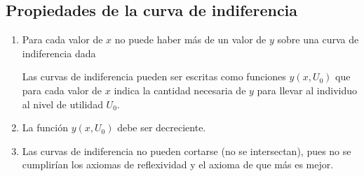 \documentclass{report}
\newcounter{axiom}
\begin{document}
\subsection{Propiedades de la curva de indiferencia}

\begin{enumerate}
    \item Para cada valor de $x$ no puede haber más de un valor de $y$ sobre una curva de indiferencia dada
    
    \begin{center}
    \end{center}
    
    Las curvas de indiferencia pueden ser escritas como funciones $y\!\left(x, U_0\right)$ que para cada valor de $x$ indica la cantidad necesaria de $y$ para llevar al individuo al nivel de utilidad $U_0$.
    
    \item La función $y\!\left(x,U_0\right)$ debe ser decreciente.
    
    \begin{center}
    \end{center}
    
    \item Las curvas de indiferencia no pueden cortarse (no se intersectan), pues no se cumplirían los axiomas de reflexividad y el axioma de que más es mejor.
    

\end{enumerate}
\end{document}

